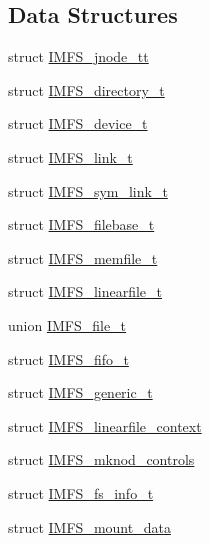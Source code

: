 \subsection*{Data Structures}
\begin{DoxyCompactItemize}
\item 
struct \mbox{\hyperlink{structIMFS__jnode__tt}{I\+M\+F\+S\+\_\+jnode\+\_\+tt}}
\item 
struct \mbox{\hyperlink{structIMFS__directory__t}{I\+M\+F\+S\+\_\+directory\+\_\+t}}
\item 
struct \mbox{\hyperlink{structIMFS__device__t}{I\+M\+F\+S\+\_\+device\+\_\+t}}
\item 
struct \mbox{\hyperlink{structIMFS__link__t}{I\+M\+F\+S\+\_\+link\+\_\+t}}
\item 
struct \mbox{\hyperlink{structIMFS__sym__link__t}{I\+M\+F\+S\+\_\+sym\+\_\+link\+\_\+t}}
\item 
struct \mbox{\hyperlink{structIMFS__filebase__t}{I\+M\+F\+S\+\_\+filebase\+\_\+t}}
\item 
struct \mbox{\hyperlink{structIMFS__memfile__t}{I\+M\+F\+S\+\_\+memfile\+\_\+t}}
\item 
struct \mbox{\hyperlink{structIMFS__linearfile__t}{I\+M\+F\+S\+\_\+linearfile\+\_\+t}}
\item 
union \mbox{\hyperlink{unionIMFS__file__t}{I\+M\+F\+S\+\_\+file\+\_\+t}}
\item 
struct \mbox{\hyperlink{structIMFS__fifo__t}{I\+M\+F\+S\+\_\+fifo\+\_\+t}}
\item 
struct \mbox{\hyperlink{structIMFS__generic__t}{I\+M\+F\+S\+\_\+generic\+\_\+t}}
\item 
struct \mbox{\hyperlink{structIMFS__linearfile__context}{I\+M\+F\+S\+\_\+linearfile\+\_\+context}}
\item 
struct \mbox{\hyperlink{structIMFS__mknod__controls}{I\+M\+F\+S\+\_\+mknod\+\_\+controls}}
\item 
struct \mbox{\hyperlink{structIMFS__fs__info__t}{I\+M\+F\+S\+\_\+fs\+\_\+info\+\_\+t}}
\item 
struct \mbox{\hyperlink{structIMFS__mount__data}{I\+M\+F\+S\+\_\+mount\+\_\+data}}
\end{DoxyCompactItemize}
